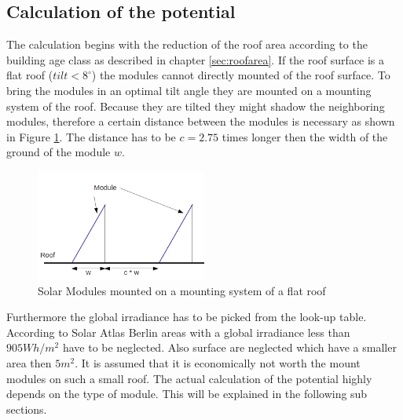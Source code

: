 \subsection{Calculation of the potential}

The calculation begins with the reduction of the roof area according to the building age class as described in chapter \ref{sec:roofarea}. If the roof surface is a flat roof ($tilt < 8 ^\circ$) the modules cannot directly mounted of the roof surface. To bring the modules in an optimal tilt angle they are mounted on a mounting system of the roof. Because they are tilted they might shadow the neighboring modules, therefore a certain distance between the modules is necessary as shown in Figure \ref{fig:flatroof}. The distance has to be $c=2.75$ times longer then the width of the ground of the module $w$.
\begin{figure}[ht]
	\centering
	\includegraphics[width=0.5\textwidth]{phase2/group2/figure/flatroofreduction.png}
	\caption{Solar Modules mounted on a mounting system of a flat roof}
	\label{fig:flatroof}
\end{figure}
Furthermore the global irradiance has to be picked from the look-up table. According to Solar Atlas Berlin  areas with a global irradiance less than $905 Wh/m^2$ have to be neglected. Also surface are neglected which have a smaller area then $5m^2$. It is assumed that it is economically not worth the mount modules on such a small roof. The actual calculation of the potential highly depends on the type of module. This will be explained in the following sub sections.







